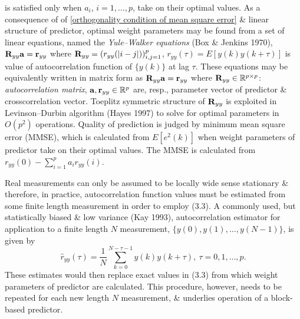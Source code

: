 \documentclass{article}
\begin{document}
\begin{enumerate}
\begin{itemize}
\begin{itemize}
			is satisfied only when $a_i$, $i = 1,\ldots,p$, take on their optimal values. As a consequence of of \eqref{orthogonality condition of mean square error} \& linear structure of predictor, optimal weight parameters may be found from a set of linear equations, named the {\it Yule--Walker equations} (Box \& Jenkins 1970), ${\bf R}_{yy}{\bf a} = {\bf r}_{yy}$ where ${\bf R}_{yy} = (r_{yy}(|i - j|))_{i,j=1}^p$, $r_{yy}(\tau) = E[y(k)y(k + \tau)]$ is value of autocorrelation function of $\{y(k)\}$ at lag $\tau$. These equations may be equivalently written in matrix form as ${\bf R}_{yy}{\bf a} = {\bf r}_{yy}$ where ${\bf R}_{yy}\in\mathbb{R}^{p\times p}$: {\it autocorrelation matrix}, ${\bf a},{\bf r}_{yy}\in\mathbb{R}^p$ are, resp., parameter vector of predictor \& crosscorrelation vector. Toeplitz symmetric structure of ${\bf R}_{yy}$ is exploited in Levinson--Durbin algorithm (Hayes 1997) to solve for optimal parameters in $O(p^2)$ operations. Quality of prediction is judged by minimum mean square error (MMSE), which is calculated from $E[e^2(k)]$ when weight parameters of predictor take on their optimal values. The MMSE is calculated from $r_{yy}(0) - \sum_{i=1}^p a_ir_{yy}(i)$.
			
			Real measurements can only be assumed to be locally wide sense stationary \& therefore, in practice, autocorrelation function values must be estimated from some finite length measurement in order to employ (3.3). A commonly used, but statistically biased \& low variance (Kay 1993), autocorrelation estimator for application to a finite length $N$ measurement, $\{y(0),y(1),\ldots,y(N - 1)\}$, is given by
			\begin{equation}
				\hat{r}_{yy}(\tau) = \frac{1}{N}\sum_{k=0}^{N - \tau - 1} y(k)y(k + \tau),\ \tau = 0,1,\ldots,p.
			\end{equation}
			These estimates would then replace exact values in (3.3) from which weight parameters of predictor are calculated. This procedure, however, needs to be repeated for each new length $N$ measurement, \& underlies operation of a block-based predictor.
			

\end{itemize}
\end{itemize}
\end{enumerate}
\end{document}
